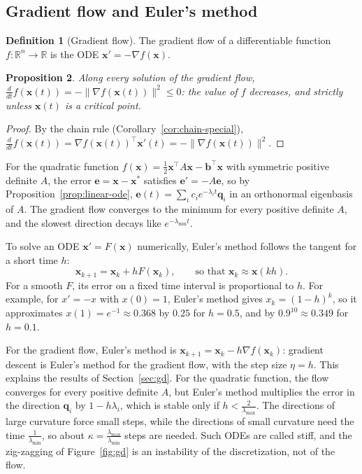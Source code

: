 \documentclass[11pt]{article}
\newcommand{\norm}[1]{\lVert #1 \rVert}
\theoremstyle{definition}
\newtheorem{definition}{Definition}[section]
\theoremstyle{plain}
\newtheorem{proposition}[definition]{Proposition}
\theoremstyle{remark}
\begin{document}
\subsection{Gradient flow and Euler's method}\label{sec:euler}

\begin{definition}[Gradient flow]\label{def:gradient-flow}
    The gradient flow of a differentiable function $f: \mathbb{R}^n \to \mathbb{R}$ is the ODE $\mathbf{x}' = -\nabla f(\mathbf{x})$.
\end{definition}

\begin{proposition}\label{prop:gradient-flow}
    Along every solution of the gradient flow, $\frac{d}{dt}f(\mathbf{x}(t)) = -\norm{\nabla f(\mathbf{x}(t))}^2 \leq 0$: the value of $f$ decreases, and strictly unless $\mathbf{x}(t)$ is a critical point.
\end{proposition}

\begin{proof}
    By the chain rule (Corollary~\ref{cor:chain-special}), $\frac{d}{dt}f(\mathbf{x}(t)) = \nabla f(\mathbf{x}(t))^\top\mathbf{x}'(t) = -\norm{\nabla f(\mathbf{x}(t))}^2$.
\end{proof}

For the quadratic function $f(\mathbf{x}) = \frac{1}{2}\mathbf{x}^\top A\mathbf{x} - \mathbf{b}^\top\mathbf{x}$ with symmetric positive definite $A$, the error $\mathbf{e} = \mathbf{x} - \mathbf{x}^*$ satisfies $\mathbf{e}' = -A\mathbf{e}$, so by Proposition~\ref{prop:linear-ode}, $\mathbf{e}(t) = \sum_i c_ie^{-\lambda_i t}\mathbf{q}_i$ in an orthonormal eigenbasis of $A$. The gradient flow converges to the minimum for every positive definite $A$, and the slowest direction decays like $e^{-\lambda_{\min}t}$.

To solve an ODE $\mathbf{x}' = F(\mathbf{x})$ numerically, Euler's method follows the tangent for a short time $h$:
\[\mathbf{x}_{k+1} = \mathbf{x}_k + hF(\mathbf{x}_k), \qquad \text{so that } \mathbf{x}_k \approx \mathbf{x}(kh).\]
For a smooth $F$, its error on a fixed time interval is proportional to $h$. For example, for $x' = -x$ with $x(0) = 1$, Euler's method gives $x_k = (1 - h)^k$, so it approximates $x(1) = e^{-1} \approx 0.368$ by $0.25$ for $h = 0.5$, and by $0.9^{10} \approx 0.349$ for $h = 0.1$.

For the gradient flow, Euler's method is $\mathbf{x}_{k+1} = \mathbf{x}_k - h\nabla f(\mathbf{x}_k)$: gradient descent is Euler's method for the gradient flow, with the step size $\eta = h$. This explains the results of Section~\ref{sec:gd}. For the quadratic function, the flow converges for every positive definite $A$, but Euler's method multiplies the error in the direction $\mathbf{q}_i$ by $1 - h\lambda_i$, which is stable only if $h < \frac{2}{\lambda_{\max}}$. The directions of large curvature force small steps, while the directions of small curvature need the time $\frac{1}{\lambda_{\min}}$, so about $\kappa = \frac{\lambda_{\max}}{\lambda_{\min}}$ steps are needed. Such ODEs are called stiff, and the zig-zagging of Figure~\ref{fig:gd} is an instability of the discretization, not of the flow.
\end{document}
